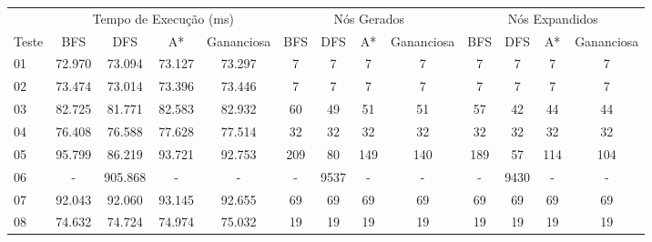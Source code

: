 \documentclass[12pt,a4paper]{article}
\begin{document}
\begin{adjustbox}{width={\textwidth}, totalheight={\textheight}, keepaspectratio}
  \begin{tabular}{l cccc cccc cccc}
    \toprule
          & \multicolumn{4}{c}{Tempo de Execução (ms)} & \multicolumn{4}{c}{Nós Gerados} & \multicolumn{4}{c}{Nós Expandidos}                                                                              \\
    \cmidrule(lr){2-5} \cmidrule(lr){6-9} \cmidrule(lr){10-13}
    Teste & BFS                                        & DFS                             & A*                                 & Gananciosa & BFS & DFS  & A*  & Gananciosa & BFS & DFS  & A*  & Gananciosa \\
    \midrule
    01    & 72.970                                     & 73.094                          & 73.127                             & 73.297     & 7   & 7    & 7   & 7          & 7   & 7    & 7   & 7          \\
    02    & 73.474                                     & 73.014                          & 73.396                             & 73.446     & 7   & 7    & 7   & 7          & 7   & 7    & 7   & 7          \\
    03    & 82.725                                     & 81.771                          & 82.583                             & 82.932     & 60  & 49   & 51  & 51         & 57  & 42   & 44  & 44         \\
    04    & 76.408                                     & 76.588                          & 77.628                             & 77.514     & 32  & 32   & 32  & 32         & 32  & 32   & 32  & 32         \\
    05    & 95.799                                     & 86.219                          & 93.721                             & 92.753     & 209 & 80   & 149 & 140        & 189 & 57   & 114 & 104        \\
    06    & -                                          & 905.868                         & -                                  & -          & -   & 9537 & -   & -          & -   & 9430 & -   & -          \\
    07    & 92.043                                     & 92.060                          & 93.145                             & 92.655     & 69  & 69   & 69  & 69         & 69  & 69   & 69  & 69         \\
    08    & 74.632                                     & 74.724                          & 74.974                             & 75.032     & 19  & 19   & 19  & 19         & 19  & 19   & 19  & 19         \\

\end{tabular}
\end{adjustbox}
\end{document}
